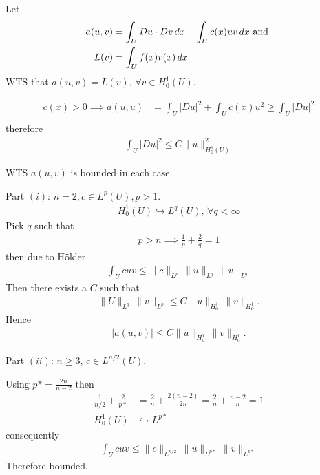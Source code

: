 \documentclass[12pt,a4paper]{report}
\begin{document}
\begin{description}

\item Let 
\begin{align*}
	a(u,v) &= \int_U Du\cdot Dv\, dx + \int_U c(x)uv\, dx \text{ and } \\
	L(v) &= \int_U f(x)v(x)\,dx
\end{align*}WTS that $a(u,v) = L(v),\,\forall v \in H_0^1(U)$.

\item \begin{align*}
	c(x) >0 \implies a(u,u) &= \int_U |Du|^2 + \int_U c(x)u^2 \ge \int_U |Du|^2 \\
\end{align*}therefore 
\begin{align*}
	\int_U |Du|^2 \le C\|u\|^2_{H_0^1(U)}
\end{align*}

\item WTS $a(u,v)$ is bounded in each case \begin{description}
	\item Part $(i)$: $n = 2, c \in L^p(U), p >1$.
	\begin{align*}
		H^1_0(U) \hookrightarrow L^q(U),\, \forall q < \infty
	\end{align*}Pick $q$ such that
	\begin{align*}
		p>n\implies \frac{1}{p}+\frac{2}{q}=1
	\end{align*}then due to H\"older
	\begin{align*}
		\int_U cuv \le \|c\|_{L^p}\,\|u\|_{L^q}\,\|v\|_{L^q}	
	\end{align*}Then there exists a $C$ such that
	\begin{align*}
		\|U\|_{L^q}\,\|v\|_{L^p} \le C\|u\|_{H_0^1}\,\|v\|_{H_0^1}.
	\end{align*}Hence
	\begin{align*}
        |a(u,v)| \le C\|u\|_{H_0^1}\,\|v\|_{H_0^1}.
	\end{align*}

	\item Part $(ii)$: $n\ge 3,\,c\in L^{n/2}(U)$.
	
	Using $p*=\frac{2n}{n-2}$ then
	\begin{align*}
		\frac{1}{n/2}+\frac{2}{p*} &= \frac{2}{n}+\frac{2(n-2)}{2n} = \frac{2}{n}+\frac{n-2}{n}=1 \\
		H_0^1(U) &\hookrightarrow L^{p*} 
	\end{align*}consequently
	\begin{align*}
		\int_U cuv \le \|c\|_{L^{n/2}}\,\|u\|_{L^{p*}}\,\|v\|_{L^{p*}}
	\end{align*}Therefore bounded.
    \end{description}


\end{description}
\end{document}
